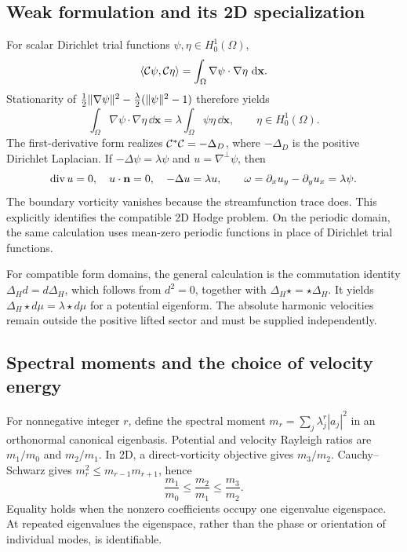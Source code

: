 \subsection{Weak formulation and its 2D specialization}
For scalar Dirichlet trial functions $\psi,\eta\in H_0^1(\Omega)$,
\begin{equation}
\langle \mathcal C\psi,\mathcal C\eta\rangle=\int_\Omega\nabla\psi\cdot\nabla\eta\,\,\mathrm d\mathbf x.
\end{equation}
Stationarity of $\frac12\lVert \nabla\psi\rVert^2-\frac\lambda2(\lVert \psi\rVert^2-1)$ therefore yields
\begin{equation}
\int_\Omega\nabla\psi\cdot\nabla\eta\,\dd\mathbf x
=\lambda\int_\Omega\psi\eta\,\dd\mathbf x,
\qquad \eta\in H_0^1(\Omega).
\end{equation}
The first-derivative form realizes $\mathcal C^*\mathcal C=-\Delta_D$, where $-\Delta_D$ is the positive Dirichlet Laplacian. If $-\Delta\psi=\lambda\psi$ and $u=\nabla^\perp\psi$, then
\begin{equation}
\operatorname{div} u=0,\quad u\cdot\mathbf n=0,\quad -\Delta u=\lambda u,
\qquad \omega=\partial_xu_y-\partial_yu_x=\lambda\psi.
\end{equation}
The boundary vorticity vanishes because the streamfunction trace does. This explicitly identifies the compatible 2D Hodge problem. On the periodic domain, the same calculation uses mean-zero periodic functions in place of Dirichlet trial functions.

For compatible form domains, the general calculation is the commutation identity $\Delta_Hd=d\Delta_H$, which follows from $d^2=0$, together with $\Delta_H\star=\star\Delta_H$. It yields $\Delta_H\star d\mu=\lambda\star d\mu$ for a potential eigenform. The absolute harmonic velocities remain outside the positive lifted sector and must be supplied independently.

\subsection{Spectral moments and the choice of velocity energy}
For nonnegative integer $r$, define the spectral moment $m_r=\sum_j\lambda_j^r|a_j|^2$ in an orthonormal canonical eigenbasis. Potential and velocity Rayleigh ratios are $m_1/m_0$ and $m_2/m_1$. In 2D, a direct-vorticity objective gives $m_3/m_2$. Cauchy--Schwarz gives $m_r^2\le m_{r-1}m_{r+1}$, hence
\[
\frac{m_1}{m_0}\le\frac{m_2}{m_1}\le\frac{m_3}{m_2}.
\]
Equality holds when the nonzero coefficients occupy one eigenvalue eigenspace. At repeated eigenvalues the eigenspace, rather than the phase or orientation of individual modes, is identifiable.

